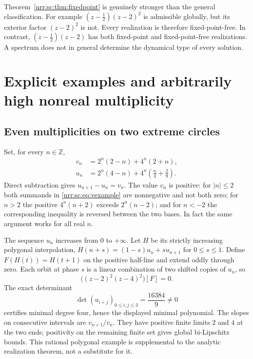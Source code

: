 \documentclass[11pt,letterpaper]{article}
\theoremstyle{definition}
\theoremstyle{remark}
\newcommand{\Z}{\mathbb Z}
\begin{document}
Theorem~\ref{nrr:sc:thm:fixedpoint} is genuinely stronger than the general
classification. For example $(z-\tfrac12)(z-2)^2$ is admissible globally,
but its exterior factor $(z-2)^2$ is not. Every realization is therefore
fixed-point-free. In contrast, $(z-\tfrac12)(z-2)$ has both fixed-point
and fixed-point-free realizations. A spectrum does not in general
determine the dynamical type of every solution.

\section{Explicit examples and arbitrarily high nonreal multiplicity}
\label{nrr:sc:sec:examples}

\subsection{Even multiplicities on two extreme circles}

Set, for every $n\in\Z$,
\begin{align}
 v_n&=2^n(2-n)+4^n(2+n),\label{nrr:sc:eq:vexample}\\
 u_n&=2^n(4-n)+4^n\left(\frac n3+\frac29\right).
 \label{nrr:sc:eq:uexample}
\end{align}
Direct subtraction gives $u_{n+1}-u_n=v_n$.
The value $v_n$ is positive: for $|n|\le2$ both summands in
\eqref{nrr:sc:eq:vexample} are nonnegative and not both zero; for $n>2$ the
positive $4^n(n+2)$ exceeds $2^n(n-2)$; and for $n<-2$ the corresponding
inequality is reversed between the two bases. In fact the same argument
works for all real $n$.

The sequence $u_n$ increases from $0$ to $+\infty$.
Let $H$ be its strictly increasing polygonal interpolation,
$H(n+s)=(1-s)u_n+su_{n+1}$ for $0\le s\le1$.
Define $F(H(t))=H(t+1)$ on the positive half-line and extend oddly through
zero. Each orbit at phase $s$ is a linear combination of two shifted
copies of $u_n$, so
\begin{equation}
 \bigl((z-2)^2(z-4)^2\bigr)[F]=0.
 \label{nrr:sc:eq:evenexample}
\end{equation}
The exact determinant
\begin{equation}
 \det(u_{i+j})_{0\le i,j\le3}=\frac{16384}{9}\ne0
 \label{nrr:sc:eq:evenhankel}
\end{equation}
certifies minimal degree four, hence the displayed minimal polynomial.
The slopes on consecutive intervals are $v_{n+1}/v_n$. They have
positive finite limits $2$ and $4$ at the two ends; positivity on the
remaining finite set gives global bi-Lipschitz bounds.
This rational polygonal example is supplemental to the analytic
realization theorem, not a substitute for it.
\end{document}
